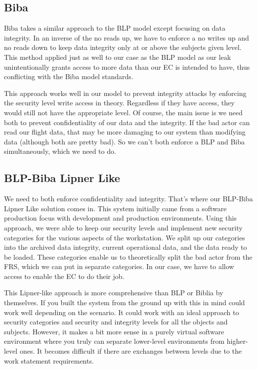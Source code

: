 \documentclass[10pt,journal,compsoc]{IEEEtran}
\begin{document}
\subsection{Biba}

Biba takes a similar approach to the BLP model except focusing on data integrity. In an inverse of the no reads up, we have to enforce a no writes up and no reads down to keep data integrity only at or above the subjects given level. This method applied just as well to our case as the BLP model as our leak unintentionally grants access to more data than our EC is intended to have, thus conflicting with the Biba model standards. 

This approach works well in our model to prevent integrity attacks by enforcing the security level write access in theory. Regardless if they have access, they would still not have the appropriate level. Of course, the main issue is we need both to prevent confidentiality of our data and the integrity. If the bad actor can read our flight data, that may be more damaging to our system than modifying data (although both are pretty bad). So we can't both enforce a BLP and Biba simultaneously, which we need to do. 

\subsection{BLP-Biba Lipner Like}

We need to both enforce confidentiality and integrity. That's where our BLP-Biba Lipner Like solution comes in. This system initially came from a software production focus with development and production environments. Using this approach, we were able to keep our security levels and implement new security categories for the various aspects of the workstation. We split up our categories into the archived data integrity, current operational data, and the data ready to be loaded. These categories enable us to theoretically split the bad actor from the FRS, which we can put in separate categories. In our case, we have to allow access to enable the EC to do their job. 

This Lipner-like approach is more comprehensive than BLP or Biblia by themselves. If you built the system from the ground up with this in mind could work well depending on the scenario. It could work with an ideal approach to security categories and security and integrity levels for all the objects and subjects. However, it makes a bit more sense in a purely virtual software environment where you truly can separate lower-level environments from higher-level ones. It becomes difficult if there are exchanges between levels due to the work statement requirements. 
\end{document}
